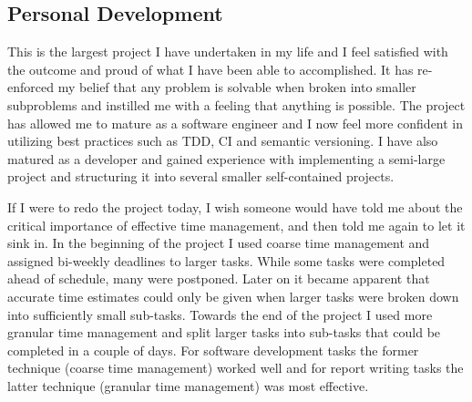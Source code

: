 
\subsection{Personal Development}

This is the largest project I have undertaken in my life and I feel satisfied with the outcome and proud of what I have been able to accomplished. It has re-enforced my belief that any problem is solvable when broken into smaller subproblems and instilled me with a feeling that anything is possible. The project has allowed me to mature as a software engineer and I now feel more confident in utilizing best practices such as TDD, CI and semantic versioning. I have also matured as a developer and gained experience with implementing a semi-large project and structuring it into several smaller self-contained projects.

If I were to redo the project today, I wish someone would have told me about the critical importance of effective time management, and then told me again to let it sink in. In the beginning of the project I used coarse time management and assigned bi-weekly deadlines to larger tasks. While some tasks were completed ahead of schedule, many were postponed. Later on it became apparent that accurate time estimates could only be given when larger tasks were broken down into sufficiently small sub-tasks. Towards the end of the project I used more granular time management and split larger tasks into sub-tasks that could be completed in a couple of days. For software development tasks the former technique (coarse time management) worked well and for report writing tasks the latter technique (granular time management) was most effective.
